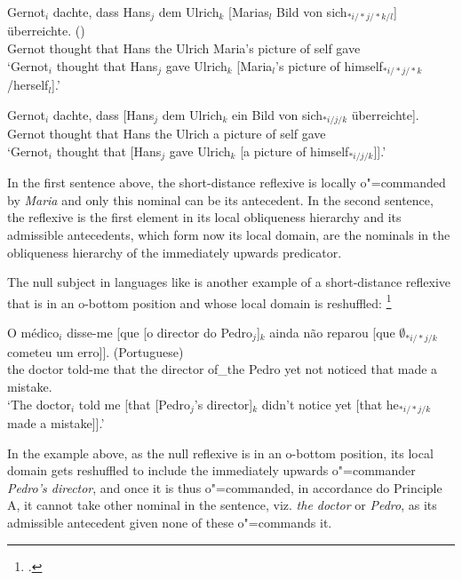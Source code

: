 \documentclass[output=paper
,modfonts
,nonflat]{langsci/langscibook}
\begin{document}
\begin{exe}
\ex
\begin{xlist}
\ex
\gll Gernot$_{i}$ dachte, dass Hans$_{j}$ dem Ulrich$_{k}$ [Marias$_{l}$ Bild von
sich$_{*i/*j/*k/l}$] \"{u}berreichte. ()\\
Gernot thought that Hans the Ulrich Maria's picture of self gave\\
\trans `Gernot$_{i}$ thought that  Hans$_{j}$ gave Ulrich$_{k}$ [Maria$_{l}$'s picture of \linebreak himself$_{*i/*j/*k}$/herself$_{l}$].'
 
\ex
\gll Gernot$_{i}$ dachte, dass [Hans$_{j}$ dem Ulrich$_{k}$ ein Bild von sich$_{*i/j/k}$ \"{u}berreichte].\\
Gernot thought that Hans the Ulrich a picture of self gave\\
\trans `Gernot$_{i}$ thought that  [Hans$_{j}$ gave Ulrich$_{k}$ [a picture of \linebreak himself$_{*i/j/k}$]].'
\end{xlist}
\end{exe}

In the first sentence above, the short-distance reflexive is 
locally \mbox{o"=commanded} by \emph{Maria} and only this nominal can be its
antecedent. In the second sentence, the reflexive is the first element
in its local obliqueness hierarchy and its admissible 
antecedents, which form now its local domain, are the nominals in the obliqueness
hierarchy of the immediately upwards predicator.

The null subject in languages like  is another example of a short-distance 
reflexive that is in an o-bottom position and whose local domain is reshuffled:%
\footnote{
\citep{brancoNullSubject:2007}.
}

\begin{exe}
\ex
		\gll O m\'{e}dico$_{i}$ disse-me [que [o director do Pedro$_{j}$]$_{k}$ ainda n\~{a}o reparou [que $\emptyset_{*i/*j/k}$ cometeu um erro]]. (Portuguese)\\
		the doctor told-me that the director of\_the Pedro yet not noticed that { } made a mistake.\\
		\trans `The doctor$_{i}$ told me [that [Pedro$_{j}$'s director]$_{k}$ didn't notice yet [that he$_{*i/*j/k}$ made a mistake]].'

\end{exe}

In the example above, as the null reflexive is in an o-bottom position, its local domain gets reshuffled to include the immediately
upwards o"=commander \emph{Pedro's director}, and once it is thus o"=commanded, in accordance do Principle A, it cannot take other nominal in the sentence,
viz. \emph{the doctor} or \emph{Pedro}, as its admissible antecedent given none of these o"=commands it.
\end{document}

